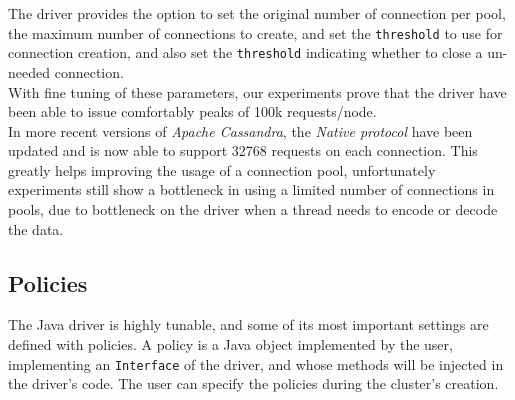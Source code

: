 \documentclass[a4paper]{report}
\newcommand{\ca}{\emph{Apache Cassandra\xspace}}
\begin{document}
The driver provides the option to set the original number of connection per pool, the maximum number of connections to create, and set the \verb;threshold; to use for connection creation, and also set the \verb;threshold; indicating whether to close a un-needed connection.\\
With fine tuning of these parameters, our experiments prove that the driver have been able to issue comfortably peaks of 100k requests/node.\\
In more recent versions of \ca{}, the \emph{Native protocol} have been updated and is now able to support 32768 requests on each connection. This greatly helps improving the usage of a connection pool, unfortunately experiments still show a bottleneck in using a limited number of connections in pools, due to bottleneck on the driver when a thread needs to encode or decode the data.

\subsection{Policies}
The Java driver is highly tunable, and some of its most important settings are defined with policies. A policy is a Java object implemented by the user, implementing an \verb;Interface; of the driver, and whose methods will be injected in the driver's code. The user can specify the policies during the cluster's creation.
\end{document}
